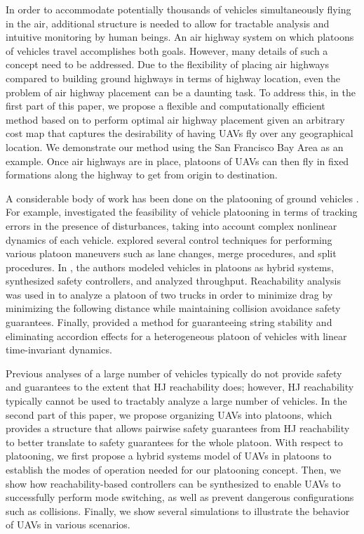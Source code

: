In order to accommodate potentially thousands of vehicles simultaneously flying in the air, additional structure is needed to allow for tractable analysis and intuitive monitoring by human beings. An air highway system on which platoons of vehicles travel accomplishes both goals. However, many details of such a concept need to be addressed. Due to the flexibility of placing air highways compared to building ground highways in terms of highway location, even the problem of air highway placement can be a daunting task. To address this, in the first part of this paper, we propose a flexible and computationally efficient method based on \cite{Sethian96} to perform optimal air highway placement given an arbitrary cost map that captures the desirability of having UAVs fly over any geographical location. We demonstrate our method using the San Francisco Bay Area as an example. Once air highways are in place, platoons of UAVs can then fly in fixed formations along the highway to get from origin to destination. 

A considerable body of work has been done on the platooning of ground vehicles \cite{Kavathekar11}. For example, \cite{McMahon90} investigated the feasibility of vehicle platooning in terms of tracking errors in the presence of disturbances, taking into account complex nonlinear dynamics of each vehicle. \cite{Hedrick92} explored several control techniques for performing various platoon maneuvers such as lane changes, merge procedures, and split procedures. In \cite{Lygeros98}, the authors modeled vehicles in platoons as hybrid systems, synthesized safety controllers, and analyzed throughput. Reachability analysis was used in \cite{Alam11} to analyze a platoon of two trucks in order to minimize drag by minimizing the following distance while maintaining collision avoidance safety guarantees. Finally, \cite{Sabau16} provided a method for guaranteeing string stability and eliminating accordion effects for a heterogeneous platoon of vehicles with linear time-invariant dynamics.

Previous analyses of a large number of vehicles typically do not provide safety and  guarantees to the extent that HJ reachability does; however, HJ reachability typically cannot be used to tractably analyze a large number of vehicles. In the second part of this paper, we propose organizing UAVs into platoons, which provides a structure that allows pairwise safety guarantees from HJ reachability to better translate to safety guarantees for the whole platoon. With respect to platooning, we first propose a hybrid systems model of UAVs in platoons to establish the modes of operation needed for our platooning concept. Then, we show how reachability-based controllers can be synthesized to enable UAVs to successfully perform mode switching, as well as prevent dangerous configurations such as collisions. Finally, we show several simulations to illustrate the behavior of UAVs in various scenarios.

